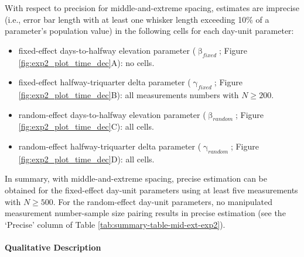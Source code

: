 \documentclass[
12pt, %
twoside,
english]{guelphthesis}
\theoremstyle{definition}
\theoremstyle{definition}
\theoremstyle{definition}
\theoremstyle{definition}
\theoremstyle{remark}
\begin{document}
With respect to precision for middle-and-extreme spacing, estimates are imprecise (i.e., error bar length with at least one whisker length exceeding 10\% of a parameter's population value) in the following cells for each day-unit parameter:
\begin{itemize}
\tightlist
\item
  fixed-effect days-to-halfway elevation parameter (\(\upbeta_{fixed}\); Figure \ref{fig:exp2_plot_time_dec}A): no cells.
\item
  fixed-effect halfway-triquarter delta parameter (\(\upgamma_{fixed}\); Figure \ref{fig:exp2_plot_time_dec}B): all measurements numbers with \(N \ge 200\).
\item
  random-effect days-to-halfway elevation parameter (\(\upbeta_{random}\); Figure \ref{fig:exp2_plot_time_dec}C): all cells.
\item
  random-effect halfway-triquarter delta parameter (\(\upgamma_{random}\); Figure \ref{fig:exp2_plot_time_dec}D): all cells.
\end{itemize}
In summary, with middle-and-extreme spacing, precise estimation can be obtained for the fixed-effect day-unit parameters using at least five measurements with \(N \ge 500\). For the random-effect day-unit parameters, no manipulated measurement number-sample size pairing results in precise estimation (see the `Precise' column of Table \ref{tab:summary-table-mid-ext-exp2}).

\hypertarget{qualitative-mid-ext-exp2}{%
\paragraph{Qualitative Description}\label{qualitative-mid-ext-exp2}}
\end{document}
